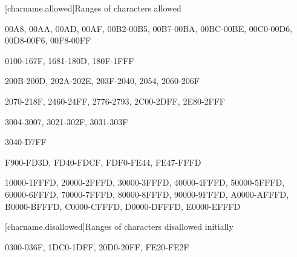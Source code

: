 
[charname.allowed]{Ranges of characters allowed}

\begin{codeblock}
00A8, 00AA, 00AD, 00AF, 00B2-00B5, 00B7-00BA, 00BC-00BE, 00C0-00D6, 00D8-00F6, 00F8-00FF

0100-167F, 1681-180D, 180F-1FFF

200B-200D, 202A-202E, 203F-2040, 2054, 2060-206F

2070-218F, 2460-24FF, 2776-2793, 2C00-2DFF, 2E80-2FFF

3004-3007, 3021-302F, 3031-303F

3040-D7FF

F900-FD3D, FD40-FDCF, FDF0-FE44, FE47-FFFD

10000-1FFFD, 20000-2FFFD, 30000-3FFFD, 40000-4FFFD, 50000-5FFFD,
  60000-6FFFD, 70000-7FFFD, 80000-8FFFD, 90000-9FFFD, A0000-AFFFD,
  B0000-BFFFD, C0000-CFFFD, D0000-DFFFD, E0000-EFFFD
\end{codeblock}

[charname.disallowed]{Ranges of characters disallowed initially}

\begin{codeblock}
0300-036F, 1DC0-1DFF, 20D0-20FF, FE20-FE2F
\end{codeblock}
